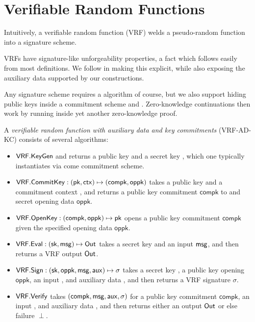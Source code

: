 
\section{Verifiable Random Functions}
\label{sec:vrf}

Intuitively, a verifiable random function (VRF) welds a pseudo-random function into a signature scheme.

VRFs have signature-like unforgeability properties, a fact which follows easily from most definitions. 
We follow \cite{agg_dkg} in making this explicit, while also
 exposing the auxiliary data supported by our constructions. 

\def\compk{\ensuremath{\mathsf{compk}}\xspace}
\def\openpk{\ensuremath{\mathsf{oppk}}\xspace}
\newcommand\CommitKey{\primalgo{CommitKey}}
\newcommand\OpenKey{\primalgo{OpenKey}}

Any signature scheme requires a \KeyGen algorithm of course, but we also
support hiding public keys inside a commitment scheme \CommitKey and \OpenKey.
Zero-knowledge continuations then work by running \OpenKey inside yet
another zero-knowledge proof. 

\begin{definition}
A {\em verifiable random function with auxiliary data and key commitments} (VRF-AD-KC) consists of several algorithms:
\begin{itemize}
\item ${\mathsf{VRF}}.{\mathsf{KeyGen}}$ and returns a public key \pk and a secret key \sk, which one typically instantiates via come commitment scheme. 
%
\item $\VRF.\CommitKey : (\pk,\ctx) \mapsto (\compk,\openpk)$ takes a public key \pk and a commitment context \ctx, and returns a public key commitment \compk to \sk and secret opening data \openpk.
\item $\VRF.\OpenKey : (\compk,\openpk) \mapsto \pk$ opens a public key commitment \compk given the specified opening data \openpk.
%
\item ${\mathsf{VRF}}.{\mathsf{Eval}} : (\mathsf{sk},\mathsf{msg}) \mapsto {\ensuremath{\mathsf{Out}}}$ takes a secret key \sk and an input $\mathsf{msg}$, and then returns a VRF output ${\mathsf{Out}}$.
\item $\VRF.\Sign : (\sk,\openpk,\msg,\aux) \mapsto \sigma$ takes a secret key \sk, a public key opening \openpk, an input \msg, and auxiliary data \aux, and then returns a VRF signature $\sigma$.
\item ${\mathsf{VRF}}.{\mathsf{Verify}}$ takes $(\compk,\msg,\aux,\sigma)$ for a public key commitment \compk, an input \msg, and auxiliary data \aux, and then returns either an output ${\mathsf{Out}}$ or else failure $\perp$.
\end{itemize}
\end{definition}

